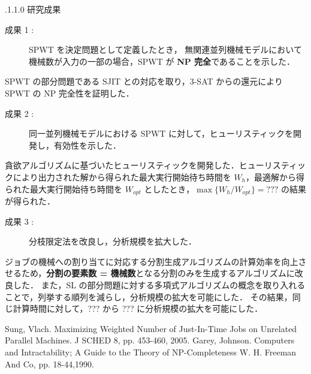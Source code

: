 \documentclass[oneside, 10pt, twocolumn]{jarticle}
\makeatletter
\def\section{\@startsection {section}{1}{\z@}{-3.5ex plus -1ex minus
-.2ex}{2.3 ex plus .2ex}{\large\bf}}
\renewcommand{\section}{
\@startsection{section}{1}{\z@}
{.1\Cvs \@plus.0\Cdp \@minus.1\Cdp}%
{.1\Cvs \@plus.1\Cdp \@minus.0\Cdp}%
{\reset@font\large\bfseries}}      %
\makeatother
\begin{document}
\section{研究成果}
\begin{description}
  \item[成果 1 : ]
  SPWT を決定問題として定義したとき，
  無関連並列機械モデルにおいて機械数が入力の一部の場合，SPWT が {\bf NP 完全}であることを示した．
\end{description}
SPWT の部分問題である SJIT との対応を取り，\textsc{3-SAT} からの還元により SPWT の NP 完全性を証明した．

\begin{description}
  \item[成果 2 : ]
  同一並列機械モデルにおける SPWT に対して，ヒューリスティックを開発し，有効性を示した．
\end{description}
貪欲アルゴリズムに基づいたヒューリスティックを開発した．ヒューリスティックにより出力された解から得られた最大実行開始待ち時間を $W_h$，最適解から得られた最大実行開始待ち時間を $W_{opt}$ としたとき，$\max\big\{W_h/W_{opt}\big\} = ???$ の結果が得られた．

\begin{description}
  \item[成果 3 : ]
  分枝限定法を改良し，分析規模を拡大した．
\end{description}

ジョブの機械への割り当てに対応する分割生成アルゴリズムの計算効率を向上させるため，{\bf 分割の要素数 = 機械数}となる分割のみを生成するアルゴリズムに改良した．
また，SL の部分問題に対する多項式アルゴリズムの概念を取り入れることで，列挙する順列を減らし，分析規模の拡大を可能にした．
その結果，同じ計算時間に対して，??? から ??? に分析規模の拡大を可能にした．


\begin{thebibliography}{9} %
  Sung, Vlach.
  Maximizing Weighted Number of Just-In-Time Jobs on Unrelated Parallel Machines. J SCHED 8, pp. 453-460, 2005.
  Garey, Johnson.
  Computers and Intractability; A Guide to the Theory of NP-Completeness
  W. H. Freeman And Co, pp. 18-44,1990.
\end{thebibliography}
\end{document}

